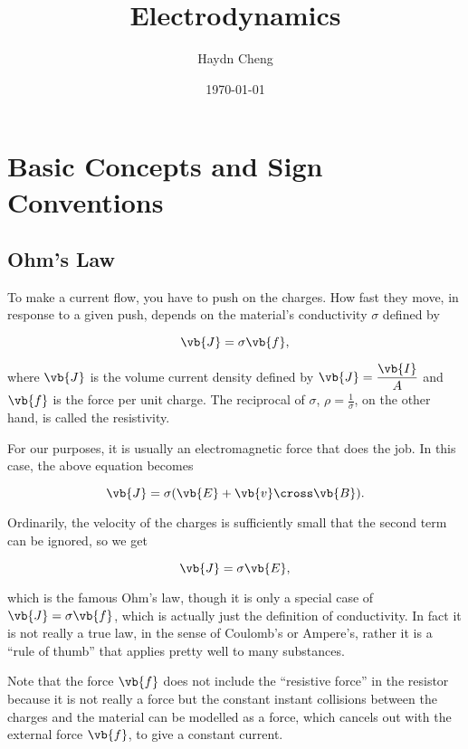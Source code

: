 \documentclass[english,a4paper,12pt]{report}
\title{Electrodynamics}
\author{Haydn Cheng}
\date{\today}
\begin{document}
\maketitle
\tableofcontents
    
\chapter{Basic Concepts and Sign Conventions}

\section{Ohm's Law}

To make a current flow, you have to push on the charges. How fast they move, in response to a given push, depends on the material's conductivity \(\sigma \) defined by 

\begin{equation}
    \vb{J} = \sigma \vb{f} , \label{ohm} 
\end{equation}

where \(\vb{J} \) is the volume current density defined by \(\displaystyle \vb{J} = \frac{\vb{I} }{A} \) and \(\vb{f} \) is the force per unit charge. The reciprocal of \(\sigma \), \(\displaystyle \rho =\frac{1}{\sigma } \), on the other hand, is called the resistivity.  

For our purposes, it is usually an electromagnetic force that does the job. In this case, the above equation becomes

\begin{equation}
    \vb{J} = \sigma (\vb{E} + \vb{v} \cross \vb{B} ).
\end{equation}

Ordinarily, the velocity of the charges is sufficiently small that the second term can be ignored, so we get

\begin{equation}
    \vb{J} = \sigma \vb{E} ,
\end{equation}

which is the famous Ohm's law, though it is only a special case of \(\vb{J} = \sigma \vb{f} \), which is actually just the definition of conductivity. In fact it is not really a true law, in the sense of Coulomb's or Ampere's, rather it is a ``rule of thumb'' that applies pretty well to many substances.

Note that the force \(\vb{f}\) does not include the ``resistive force'' in the resistor because it is not really a force but the constant instant collisions between the charges and the material can be modelled as a force, which cancels out with the external force \(\vb{f}\), to give a constant current.
\end{document}

